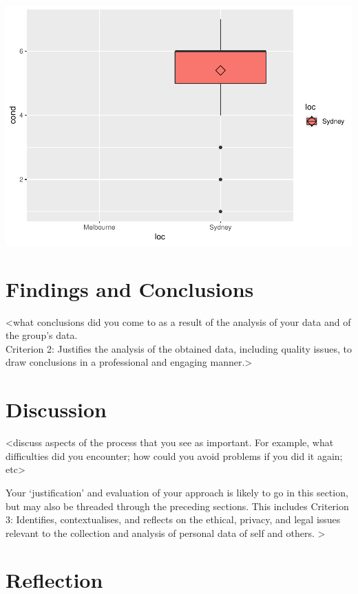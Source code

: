\documentclass[]{article}
\begin{document}
\includegraphics{AT2_template__medium__files/figure-latex/unnamed-chunk-13-1.pdf}

\hypertarget{findings-and-conclusions}{%
\section{Findings and Conclusions}\label{findings-and-conclusions}}

\textless what conclusions did you come to as a result of the analysis
of your data and of the group's data.\\
Criterion 2: Justifies the analysis of the obtained data, including
quality issues, to draw conclusions in a professional and engaging
manner.\textgreater{}

\hypertarget{discussion}{%
\section{Discussion}\label{discussion}}

\textless discuss aspects of the process that you see as important. For
example, what difficulties did you encounter; how could you avoid
problems if you did it again; etc\textgreater{}

Your `justification' and evaluation of your approach is likely to go in
this section, but may also be threaded through the preceding sections.
This includes Criterion 3: Identifies, contextualises, and reflects on
the ethical, privacy, and legal issues relevant to the collection and
analysis of personal data of self and others. \textgreater{}

\hypertarget{reflection}{%
\section{Reflection}\label{reflection}}
\end{document}
